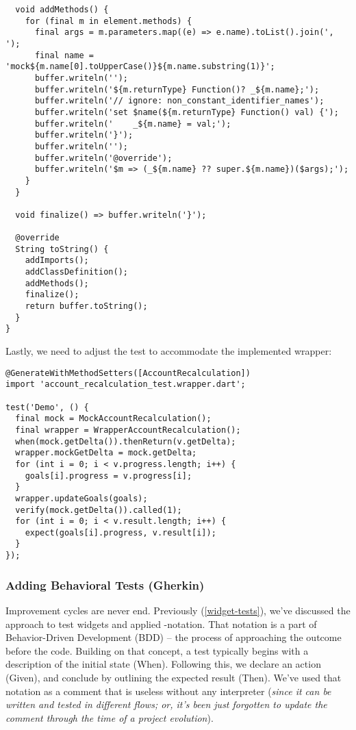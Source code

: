 \begin{lstlisting}
  void addMethods() {
    for (final m in element.methods) {
      final args = m.parameters.map((e) => e.name).toList().join(', ');
      final name = 'mock${m.name[0].toUpperCase()}${m.name.substring(1)}';
      buffer.writeln('');
      buffer.writeln('${m.returnType} Function()? _${m.name};');
      buffer.writeln('// ignore: non_constant_identifier_names');
      buffer.writeln('set $name(${m.returnType} Function() val) {');
      buffer.writeln('    _${m.name} = val;');
      buffer.writeln('}');
      buffer.writeln('');
      buffer.writeln('@override');
      buffer.writeln('$m => (_${m.name} ?? super.${m.name})($args);');
    }
  }

  void finalize() => buffer.writeln('}');

  @override
  String toString() {
    addImports();
    addClassDefinition();
    addMethods();
    finalize();
    return buffer.toString();
  }
}
\end{lstlisting}

\noindent Lastly, we need to adjust the test to accommodate the implemented wrapper:

\begin{lstlisting}
@GenerateWithMethodSetters([AccountRecalculation])
import 'account_recalculation_test.wrapper.dart';

test('Demo', () {
  final mock = MockAccountRecalculation();
  final wrapper = WrapperAccountRecalculation();
  when(mock.getDelta()).thenReturn(v.getDelta);
  wrapper.mockGetDelta = mock.getDelta;
  for (int i = 0; i < v.progress.length; i++) {
    goals[i].progress = v.progress[i];
  }
  wrapper.updateGoals(goals);
  verify(mock.getDelta()).called(1);
  for (int i = 0; i < v.result.length; i++) {
    expect(goals[i].progress, v.result[i]);
  }
});
\end{lstlisting}


\subsubsection{Adding Behavioral Tests (Gherkin)} \label{t-gherkin}

Improvement cycles are never end. Previously (\ref{widget-tests}), we've discussed the approach to test widgets and 
applied -notation. That notation is a part of Behavior-Driven Development (BDD) -- the 
process of approaching the outcome before the code. Building on that concept, a test typically 
begins with a description of the initial state (When). Following this, we declare an action (Given), and conclude by 
outlining the expected result (Then). We've used that notation as a comment that is useless without any interpreter 
(\emph{since it can be written and tested in different flows; or, it's been just forgotten to update the comment 
through the time of a project evolution}).

